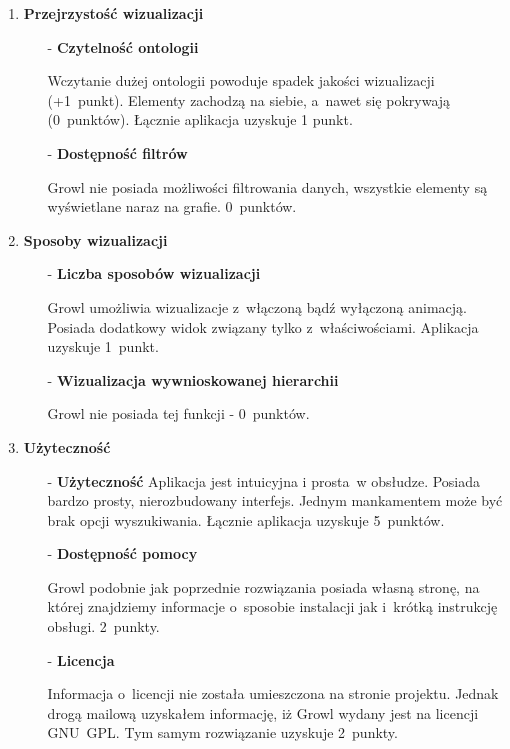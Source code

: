 \begin{enumerate}
\item{\bf Przejrzystość wizualizacji}
\begin{itemize}
 \item[-]{\bf Czytelność ontologii} 

  \nopagebreak
Wczytanie dużej ontologii powoduje spadek jakości wizualizacji (+1~punkt). Elementy zachodzą na siebie, a~nawet się pokrywają (0~punktów). 
Łącznie aplikacja uzyskuje 1 punkt.


 \item[-]{\bf Dostępność filtrów} 

  \nopagebreak
Growl nie posiada możliwości filtrowania danych, wszystkie elementy są wyświetlane naraz na grafie. 0~punktów. 




\end{itemize}

\item{\bf Sposoby wizualizacji}
\begin{itemize}
 \item[-]{\bf Liczba sposobów wizualizacji } 

  \nopagebreak
Growl umożliwia wizualizacje z~włączoną bądź wyłączoną animacją. Posiada dodatkowy widok związany tylko z~właściwościami. Aplikacja uzyskuje 1~punkt.
 

 \item[-]{\bf  Wizualizacja wywnioskowanej hierarchii } 

  \nopagebreak
Growl nie posiada tej funkcji - 0~punktów. 

\end{itemize}


\item{\bf Użyteczność}
\begin{itemize}
 \item[-]{\bf Użyteczność  } 
  Aplikacja jest intuicyjna i prosta~w obsłudze. Posiada bardzo prosty, nierozbudowany interfejs. Jednym mankamentem może być brak opcji wyszukiwania. 
Łącznie aplikacja uzyskuje 5~punktów.
  \nopagebreak


 \item[-]{\bf Dostępność pomocy  } 

  \nopagebreak
Growl podobnie jak poprzednie rozwiązania posiada własną stronę, na której znajdziemy informacje o~sposobie instalacji jak i~krótką 
instrukcję obsługi. 2~punkty.



 \item[-]{\bf Licencja  } 

  \nopagebreak
Informacja o~licencji nie została umieszczona na stronie projektu. Jednak drogą mailową uzyskałem informację, iż Growl wydany jest na licencji  GNU~GPL.
Tym samym rozwiązanie uzyskuje 2~punkty.
\end{itemize}


\end{enumerate}



